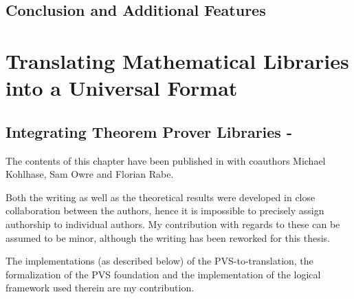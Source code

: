 \documentclass[a4paper,11pt]{book}
\begin{document}
%
%
%
%
%
%


\chapter{Conclusion and Additional Features}\label{sec:lf:lfx:conc}



\part{Translating Mathematical Libraries into a Universal Format}\label{ch:import}



\chapter{Integrating Theorem Prover Libraries - \pvs}\label{ch:import:pvs}

\begin{disclaimer*}
	The contents of this chapter have been published in \cite{KohMueOwr:mpagsiuf17} with coauthors Michael Kohlhase, Sam Owre and Florian Rabe.
	
	Both the writing as well as the theoretical results were developed in close collaboration between the authors, hence it is impossible to precisely assign authorship to individual authors. My contribution with regards to these can be assumed to be minor, although the writing has been reworked for this thesis.
	
	The implementations (as described below) of the PVS-to-\omdoc translation, the formalization of the PVS foundation and the implementation of the logical framework used therein are my contribution.
\end{disclaimer*}
\end{document}
